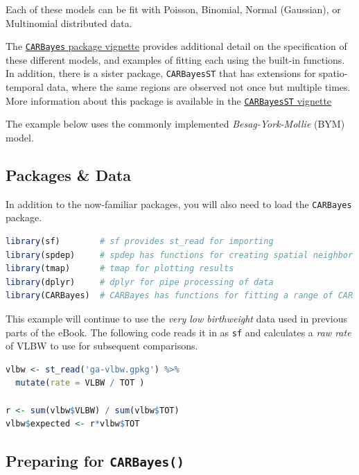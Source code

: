 \documentclass[
]{book}
\newcommand{\passthrough}[1]{#1}
\begin{document}
Each of these models can be fit with Poisson, Binomial, Normal (Gaussian), or Multinomial distributed data.

The \href{https://cran.r-project.org/web/packages/CARBayes/vignettes/CARBayes.pdf}{\passthrough{\lstinline!CARBayes!} package vignette} provides additional detail on the specification of these different models, and examples of fitting each using the built-in functions. In addition, there is a sister package, \passthrough{\lstinline!CARBayesST!} that has extensions for spatio-temporal data, where the same regions are observed not once but multiple times. More information about this package is available in the \href{https://cran.r-project.org/web/packages/CARBayesST/vignettes/CARBayesST.pdf}{\passthrough{\lstinline!CARBayesST!} vignette}

The example below uses the commonly implemented \emph{Besag-York-Mollie} (BYM) model.

\hypertarget{packages-data}{%
\subsection{Packages \& Data}\label{packages-data}}

In addition to the now-familiar packages, you will also need to load the \passthrough{\lstinline!CARBayes!} package.

\begin{lstlisting}[language=R]
library(sf)        # sf provides st_read for importing
library(spdep)     # spdep has functions for creating spatial neighbor objects
library(tmap)      # tmap for plotting results
library(dplyr)     # dplyr for pipe processing of data
library(CARBayes)  # CARBayes has functions for fitting a range of CAR models
\end{lstlisting}

This example will continue to use the \emph{very low birthweight} data used in previous parts of the eBook. The following code reads it in as \passthrough{\lstinline!sf!} and calculates a \emph{raw rate} of VLBW to use for subsequent comparisons.

\begin{lstlisting}[language=R]
vlbw <- st_read('ga-vlbw.gpkg') %>%
  mutate(rate = VLBW / TOT )

r <- sum(vlbw$VLBW) / sum(vlbw$TOT)
vlbw$expected <- r*vlbw$TOT
\end{lstlisting}

\hypertarget{preparing-for-carbayes}{%
\subsection{\texorpdfstring{Preparing for \texttt{CARBayes()}}{Preparing for CARBayes()}}\label{preparing-for-carbayes}}
\end{document}
